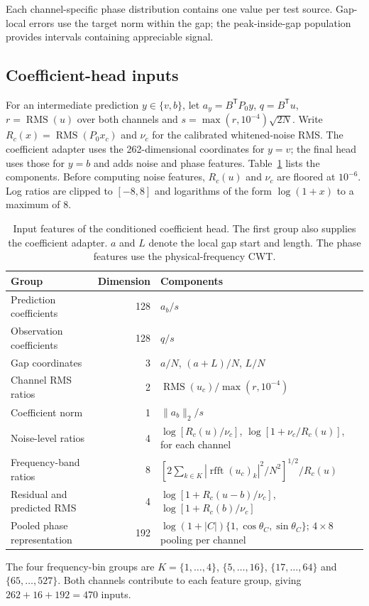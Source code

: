 \documentclass[10pt,prd,aps,a4paper,twocolumn,superscriptaddress,nofootinbib,floatfix]{revtex4-2}
\begin{document}
Each channel-specific phase distribution contains one value per test source. Gap-local errors use the target norm within the gap; the peak-inside-gap population provides intervals containing appreciable signal.



\subsection{Coefficient-head inputs}
For an intermediate prediction $y\in\{v,b\}$, let $a_y=B^{\mathsf T}P_0y$, $q=B^{\mathsf T}u$, $r=\operatorname{RMS}(u)$ over both channels and $s=\max(r,10^{-4})\sqrt{2N}$. Write $R_c(x)=\operatorname{RMS}(P_0x_c)$ and $\nu_c$ for the calibrated whitened-noise RMS. The coefficient adapter uses the 262-dimensional coordinates for $y=v$; the final head uses those for $y=b$ and adds noise and phase features. Table~\ref{tab:head_features} lists the components. Before computing noise features, $R_c(u)$ and $\nu_c$ are floored at $10^{-6}$. Log ratios are clipped to $[-8,8]$ and logarithms of the form $\log(1+x)$ to a maximum of 8.

\begin{table}[t]\centering
\caption{Input features of the conditioned coefficient head. The first group also supplies the coefficient adapter. $a$ and $L$ denote the local gap start and length. The phase features use the physical-frequency CWT.}\label{tab:head_features}
\begin{tabular}{lrl}\hline\hline
Group & Dimension & Components\\\hline
Prediction coefficients & 128 & $a_b/s$\\
Observation coefficients & 128 & $q/s$\\
Gap coordinates & 3 & $a/N$, $(a+L)/N$, $L/N$\\
Channel RMS ratios & 2 & $\operatorname{RMS}(u_c)/\max(r,10^{-4})$\\
Coefficient norm & 1 & $\|a_b\|_2/s$\\\hline
Noise-level ratios & 4 & $\log[R_c(u)/\nu_c]$, $\log[1+\nu_c/R_c(u)]$, for each channel\\
Frequency-band ratios & 8 & $[2\sum_{k\in K}|\operatorname{rfft}(u_c)_k|^2/N^2]^{1/2}/R_c(u)$\\
Residual and predicted RMS & 4 & $\log[1+R_c(u-b)/\nu_c]$, $\log[1+R_c(b)/\nu_c]$\\\hline
Pooled phase representation & 192 & $\log(1+|C|)\{1,\cos\theta_C,\sin\theta_C\}$; $4\times8$ pooling per channel\\
\hline\hline\end{tabular}

\smallskip\parbox{0.96\textwidth}{The four frequency-bin groups are $K=\{1,\ldots,4\}$, $\{5,\ldots,16\}$, $\{17,\ldots,64\}$ and $\{65,\ldots,527\}$. Both channels contribute to each feature group, giving $262+16+192=470$ inputs.}
\end{table}
\end{document}
